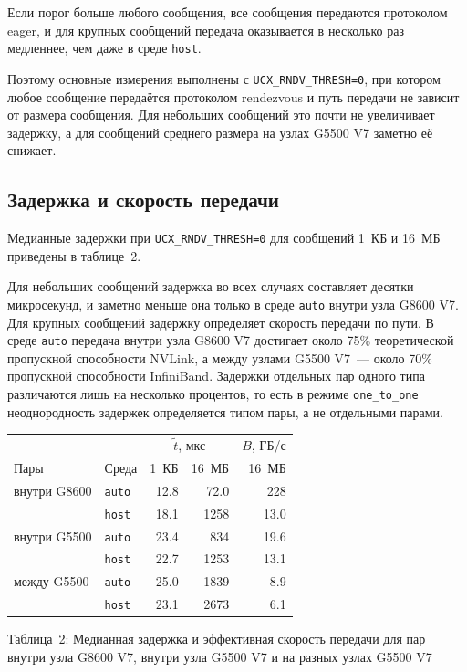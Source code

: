 Если порог больше любого сообщения, все сообщения передаются протоколом eager, и для крупных сообщений передача оказывается в несколько раз медленнее, чем даже в среде \texttt{host}.

Поэтому основные измерения выполнены с \texttt{UCX\_RNDV\_THRESH=0}, при котором любое сообщение передаётся протоколом rendezvous и путь передачи не зависит от размера сообщения. Для небольших сообщений это почти не увеличивает задержку, а для сообщений среднего размера на узлах G5500 V7 заметно её снижает.

\subsection{Задержка и скорость передачи}

Медианные задержки при \texttt{UCX\_RNDV\_THRESH=0} для сообщений 1~КБ и 16~МБ приведены в таблице~2.

Для небольших сообщений задержка во всех случаях составляет десятки микросекунд, и заметно меньше она только в среде \texttt{auto} внутри узла G8600 V7. Для крупных сообщений задержку определяет скорость передачи по пути. В среде \texttt{auto} передача внутри узла G8600 V7 достигает около 75\% теоретической пропускной способности NVLink, а между узлами G5500 V7~--- около 70\% пропускной способности InfiniBand. Задержки отдельных пар одного типа различаются лишь на несколько процентов, то есть в режиме \texttt{one\_to\_one} неоднородность задержек определяется типом пары, а не отдельными парами.

\medskip
\noindent\begin{minipage}{\textwidth}
\begin{center}
\small
\renewcommand{\arraystretch}{1.15}
\begin{tabular}{@{}llrrr@{}}
\hline
 & & \multicolumn{2}{c}{$\tilde t$, мкс} & $B$, ГБ/с \\
Пары & Среда & 1~КБ & 16~МБ & 16~МБ \\
\hline
внутри G8600 & \texttt{auto} & 12.8 & 72.0 & 228 \\
 & \texttt{host} & 18.1 & 1258 & 13.0 \\
\hline
внутри G5500 & \texttt{auto} & 23.4 & 834 & 19.6 \\
 & \texttt{host} & 22.7 & 1253 & 13.1 \\
\hline
между G5500 & \texttt{auto} & 25.0 & 1839 & 8.9 \\
 & \texttt{host} & 23.1 & 2673 & 6.1 \\
\hline
\end{tabular}

\smallskip
{\normalsize Таблица~2: Медианная задержка и эффективная скорость передачи для пар внутри узла G8600 V7, внутри узла G5500 V7 и на разных узлах G5500 V7}
\end{center}
\end{minipage}
\medskip

